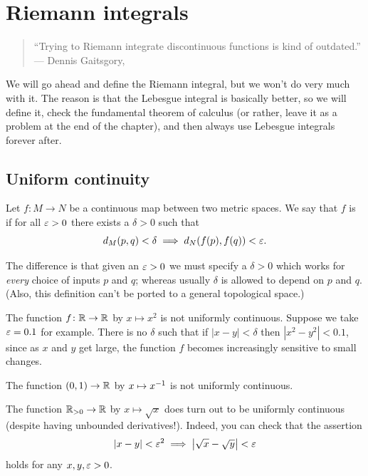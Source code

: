 \chapter{Riemann integrals}
\label{ch:riemann_integrals}
\begin{quote}
	\footnotesize
	``Trying to Riemann integrate discontinuous
	functions is kind of outdated.'' \\
	--- Dennis Gaitsgory, \cite{ref:55b}
\end{quote}

We will go ahead and define the Riemann integral,
but we won't do very much with it.
The reason is that the Lebesgue integral is basically better,
so we will define it, check the fundamental theorem of calculus
(or rather, leave it as a problem at the end of the chapter),
and then always use Lebesgue integrals forever after.

\section{Uniform continuity}
\begin{definition}
	Let $f \colon M \to N$ be a continuous
	map between two metric spaces.
	We say that $f$ is  if
	for all $\varepsilon > 0$ there exists a $\delta > 0$ such that
	\[ d_M(p,q) < \delta \implies d_N(f(p), f(q)) < \varepsilon. \]
\end{definition}
The difference is that given an $\varepsilon > 0$ we must specify a $\delta > 0$
which works for \emph{every} choice of inputs $p$ and $q$;
whereas usually $\delta$ is allowed to depend on $p$ and $q$.
(Also, this definition can't be ported
to a general topological space.)

\begin{example}
	\listhack
	\begin{enumerate}[(a)]
		\ii The function $f \colon \mathbb R \to \mathbb R$ by $x \mapsto x^2$
		is not uniformly continuous.
		Suppose we take $\varepsilon = 0.1$ for example.
		There is no $\delta$ such that if $|x-y| < \delta$
		then $|x^2-y^2| < 0.1$,
		since as $x$ and $y$ get large,
		the function $f$ becomes increasingly sensitive
		to small changes.

		\ii The function $(0,1) \to \mathbb R$ by $x \mapsto x^{-1}$
		is not uniformly continuous.

		\ii The function $\mathbb R_{>0} \to \mathbb R$ by $x \mapsto \sqrt x$
		does turn out to be uniformly continuous
		(despite having unbounded derivatives!).
		Indeed, you can check that the assertion
		\[ \left\lvert x-y  \right\rvert < \varepsilon^2
			\implies \left\lvert \sqrt x - \sqrt y \right\rvert
			< \varepsilon \]
		holds for any $x, y, \varepsilon > 0$.
	\end{enumerate}
\end{example}


